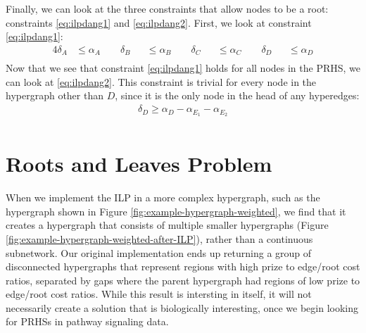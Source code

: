 \documentclass[12pt,twoside]{reedthesis}
\theoremstyle{definition}
\begin{document}
Finally, we can look at the three constraints that allow nodes to be a root: constraints \eqref{eq:ilpdang1} and \eqref{eq:ilpdang2}. First, we look at constraint \eqref{eq:ilpdang1}:
\begin{alignat*}{4}
  \delta_A &\leq \alpha_A \qquad \delta_B &&\leq \alpha_B \qquad \delta_C &&\leq \alpha_C \qquad \delta_D &&\leq \alpha_D\\
\end{alignat*}%
Now that we see that constraint \eqref{eq:ilpdang1} holds for all nodes in the PRHS, we can look at \ref{eq:ilpdang2}. This constraint is trivial for every node in the hypergraph other than $D$, since it is the only node in the head of any hyperedges:
\begin{align*}
 \delta_D \geq \alpha_{D} - \alpha_{E_1} - \alpha_{E_2}\\
\end{align*}%


\section{Roots and Leaves Problem}

When we implement the ILP in a more complex hypergraph, such as the hypergraph shown in Figure \ref{fig:example-hypergraph-weighted}, we find that it creates a hypergraph that consists of multiple smaller hypergraphs (Figure \ref{fig:example-hypergraph-weighted-after-ILP}), rather than a continuous subnetwork. Our original implementation ends up returning a group of disconnected hypergraphs that represent regions with high prize to edge/root cost ratios, separated by gaps where the parent hypergraph had regions of low prize to edge/root cost ratios. While this result is intersting in itself, it will not necessarily create a solution that is biologically interesting, once we begin looking for PRHSs in pathway signaling data.\par
\end{document}

